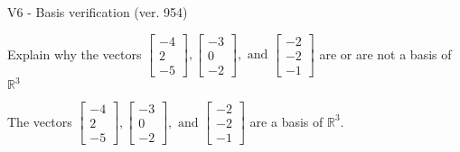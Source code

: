 \begin{exercise}
  \begin{exerciseTitle}V6 - Basis verification (ver. 954)\end{exerciseTitle}
  \begin{exerciseStatement}
    Explain why the vectors \(\left[\begin{array}{r}
-4 \\
2 \\
-5
\end{array}\right] , \left[\begin{array}{r}
-3 \\
0 \\
-2
\end{array}\right] , \text{ and } \left[\begin{array}{r}
-2 \\
-2 \\
-1
\end{array}\right]\) are or are not a basis of \(\mathbb{R}^3\)	


  \end{exerciseStatement}
  \begin{exerciseAnswer}
   The vectors \(\left[\begin{array}{r}
-4 \\
2 \\
-5
\end{array}\right] , \left[\begin{array}{r}
-3 \\
0 \\
-2
\end{array}\right] , \text{ and } \left[\begin{array}{r}
-2 \\
-2 \\
-1
\end{array}\right]\) 
  	 are  a basis of \(\mathbb{R}^3\).
  


  \end{exerciseAnswer}
\end{exercise}